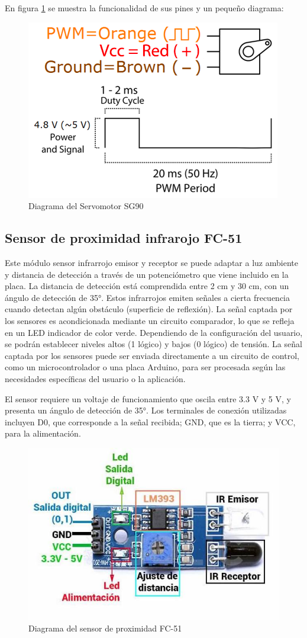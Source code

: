 \documentclass[12pt,a4paper]{article}
\begin{document}
En figura \ref{fig:4} se muestra la funcionalidad de sus pines y un pequeño diagrama:
\begin{figure}[H]
    \centering
    \includegraphics[width=0.5\linewidth]{Imagenes/SG.png}
    \caption{Diagrama del Servomotor SG90 \cite{sg90}}
    \label{fig:4}
\end{figure}

\subsection{Sensor de proximidad infrarojo FC-51}
Este módulo sensor infrarrojo emisor y receptor se puede adaptar a luz ambiente y distancia de detección a través de un potenciómetro que viene incluido en la placa. La distancia de detección está comprendida entre 2 cm y 30 cm, con un ángulo de detección de 35°. Estos infrarrojos emiten señales a cierta frecuencia cuando detectan algún obstáculo (superficie de reflexión). La señal captada por los sensores es acondicionada mediante un circuito comparador, lo que se refleja en un LED indicador de color verde. Dependiendo de la configuración del usuario, se podrán establecer niveles altos (1 lógico) y bajos (0 lógico) de tensión. La señal captada por los sensores puede ser enviada directamente a un circuito de control, como un microcontrolador o una placa Arduino, para ser procesada según las necesidades específicas del usuario o la aplicación. \cite{irsensor}

El sensor requiere un voltaje de funcionamiento que oscila entre 3.3 V y 5 V, y presenta un ángulo de detección de 35°. Los terminales de conexión utilizadas incluyen D0, que corresponde a la señal recibida; GND, que es la tierra; y VCC, para la alimentación. \cite{irsensor}

\begin{figure}[H]
    \centering
    \includegraphics[width=0.5\linewidth]{Imagenes/FC-51.jpeg}
    \caption{Diagrama del sensor de proximidad FC-51\cite{sfc51}}
    \label{fig:5}
\end{figure}
\end{document}
